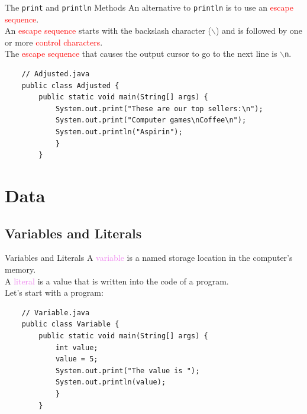 \documentclass[11pt]{beamer}
\newcommand{\red}[1]{\textcolor{red}{#1}}
\newcommand{\violet}[1]{\textcolor{violet}{#1}}
\begin{document}
\begin{frame}[fragile]{The \texttt{print} and \texttt{println} Methods}
    An alternative to \texttt{println} is to use an \red{escape sequence}. \\ \vspace{1em}
    An \red{escape sequence} starts with the backslash character ($\backslash$) and is followed by one or more \red{control characters}. \\ \vspace{1em}
    The \red{escape sequence} that causes the output cursor to go to the next line is \texttt{$\backslash$n}.
    \begin{lstlisting}
    // Adjusted.java
    public class Adjusted {
        public static void main(String[] args) {
            System.out.print("These are our top sellers:\n");
            System.out.print("Computer games\nCoffee\n");
            System.out.println("Aspirin");
            }
        }
    \end{lstlisting}
\end{frame}

\section{Data}
\subsection{Variables and Literals}
\begin{frame}[fragile]{Variables and Literals}
    A \violet{variable} is a named storage location in the computer's memory. \\ \vspace{1em} 
    A \violet{literal} is a value that is written into the code of a program. \\ \vspace{1em}
    Let's start with a program:
    \begin{lstlisting}
    // Variable.java
    public class Variable {
        public static void main(String[] args) {
            int value;
            value = 5;
            System.out.print("The value is ");
            System.out.println(value);
            }
        }
    \end{lstlisting}
\end{frame}
\end{document}
